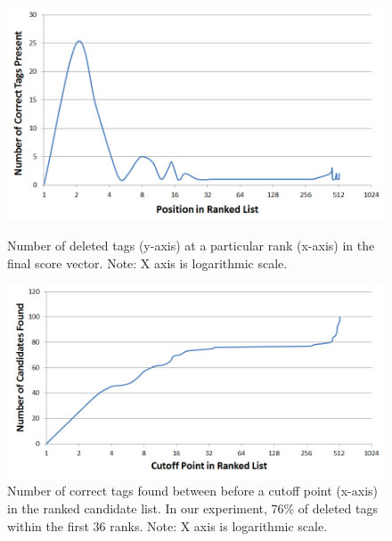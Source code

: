 \begin{figure}[t]

\begin{minipage}[b]{\linewidth}
\centering
\includegraphics[width=\textwidth]{media/chapter6/axis/ranks-simple-graph.png}
\end{minipage}
\caption{Number of deleted tags (y-axis) at a particular rank (x-axis) in the final score vector. Note: X axis is logarithmic scale.}
\label{fig:real-world-results}

\vspace{0.5cm}

\begin{minipage}[b]{\linewidth}
\centering
\includegraphics[width=\textwidth]{media/chapter6/axis/ranks-cumulative-log.png}
\end{minipage}
\caption{Number of correct tags found between before a cutoff point (x-axis) in the ranked candidate list. In our experiment, 76\% of deleted tags within the first 36 ranks. Note: X axis is logarithmic scale.}
\label{fig:real-world-results-cumulative}

\end{figure}


